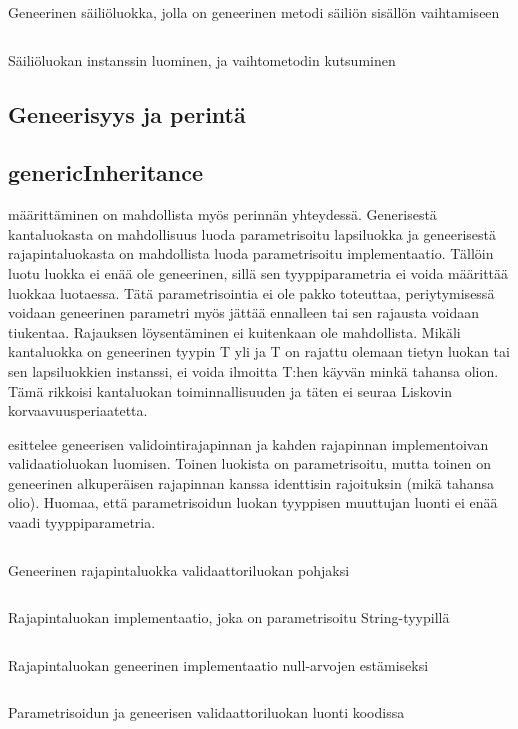 \documentclass{tufte-book}
\newcommand{\code}[3]{
\begin{listing}
    \inputminted{java}{OhjelmointiopasEsimerkit/src/#1/#2.java}
    \caption{#3}
    \label{Java-#1-#2}
\end{listing}
}
\begin{document}
\code{week10/genericexample}{GenericContainer}{Geneerinen säiliöluokka, jolla on geneerinen metodi
säiliön sisällön vaihtamiseen}
\code{week10/genericexample}{GenericExample}{Säiliöluokan instanssin luominen, ja vaihtometodin
kutsuminen}

\subsection{Geneerisyys ja perintä}
\subsection{genericInheritance}

 määrittäminen on mahdollista myös perinnän yhteydessä.
Generisestä kantaluokasta on mahdollisuus luoda parametrisoitu lapsiluokka ja geneerisestä
rajapintaluokasta on mahdollista luoda parametrisoitu implementaatio. Tällöin luotu luokka
ei enää ole geneerinen, sillä sen tyyppiparametria ei voida määrittää luokkaa luotaessa. Tätä
parametrisointia ei ole pakko toteuttaa, periytymisessä voidaan geneerinen parametri myös
jättää ennalleen tai sen rajausta voidaan tiukentaa. Rajauksen löysentäminen ei kuitenkaan ole
mahdollista. Mikäli kantaluokka on geneerinen tyypin T yli ja T on rajattu olemaan tietyn luokan
tai sen lapsiluokkien instanssi, ei voida ilmoitta T:hen käyvän minkä tahansa olion. Tämä rikkoisi
kantaluokan toiminnallisuuden ja täten ei seuraa \gls{Liskovin korvaavuusperiaate}tta.

 esittelee geneerisen validointirajapinnan ja kahden
rajapinnan implementoivan validaatioluokan luomisen. Toinen luokista on parametrisoitu, mutta
toinen on geneerinen alkuperäisen rajapinnan kanssa identtisin rajoituksin (mikä tahansa olio).
Huomaa, että parametrisoidun luokan tyyppisen muuttujan luonti ei enää vaadi tyyppiparametria.

\code{week10/genericinheritance}{Validator}{Geneerinen rajapintaluokka validaattoriluokan
pohjaksi}
\code{week10/genericinheritance}{StringValidator}{Rajapintaluokan implementaatio, joka on 
parametrisoitu String-tyypillä}
\code{week10/genericinheritance}{NonNullValidator}{Rajapintaluokan geneerinen implementaatio
null-arvojen estämiseksi}
\code{week10/genericinheritance}{GenericInheritanceExample}{Parametrisoidun ja geneerisen
validaattoriluokan luonti koodissa}

\end{document}

